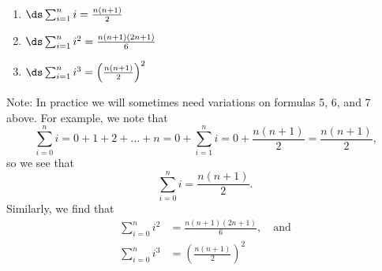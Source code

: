 \setboxwidth{75pt}
{~\\[-\baselineskip]\noindent\begin{minipage}[t]{200pt}
\iflatexml{}
\end{minipage}%
\begin{minipage}[t]{150pt}
\begin{enumerate}[resume=summationprop]
\fi
	\item	$\ds \sum_{i=1}^n i = \frac{n(n+1)}2$
	\item	$\ds \sum_{i=1}^n i^2 = \frac{n(n+1)(2n+1)}6$
	\item	$\ds \sum_{i=1}^n i^3 = \left(\frac{n(n+1)}2\right)^2$
	\end{enumerate}
\end{minipage}}

Note: In practice we will sometimes need variations on formulas 5, 6, and 7 above. For example, we note that
\[
\sum_{i=0}^n i=0+1+2+\dots+n
=0+\sum_{i=1}^n i=0+\frac{n(n+1)}{2}
=\frac{n(n+1)}{2}\text{,}
\]
so we see that \[\sum_{i=0}^n i=\frac{n(n+1)}{2}.\] Similarly, we find that 
\begin{align*}
\sum_{i=0}^n i^2&=\frac{n(n+1)(2n+1)}{6},\quad\text{and}\\
\sum_{i=0}^n i^3&=\left(\frac{n(n+1)}{2}\right)^2\\
\end{align*}

